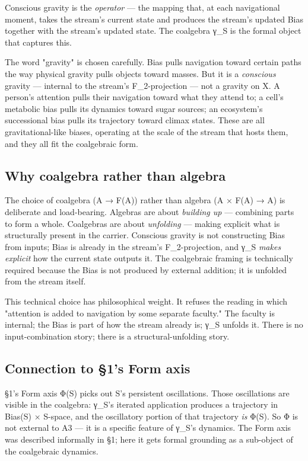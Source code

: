 \documentclass[11pt, openany]{book}
\begin{document}
Conscious gravity is the \textit{operator} --- the mapping that, at each navigational moment, takes the stream's current state and produces the stream's updated Bias together with the stream's updated state. The coalgebra γ\_\allowbreak{}S is the formal object that captures this.

The word "gravity" is chosen carefully. Bias pulls navigation toward certain paths the way physical gravity pulls objects toward masses. But it is a \textit{conscious} gravity --- internal to the stream's F\_\allowbreak{}2-projection --- not a gravity on X. A person's attention pulls their navigation toward what they attend to; a cell's metabolic bias pulls its dynamics toward sugar sources; an ecosystem's successional bias pulls its trajectory toward climax states. These are all gravitational-like biases, operating at the scale of the stream that hosts them, and they all fit the coalgebraic form.

\subsection{Why coalgebra rather than algebra}

The choice of coalgebra (A → F(A)) rather than algebra (A × F(A) → A) is deliberate and load-bearing. Algebras are about \textit{building up} --- combining parts to form a whole. Coalgebras are about \textit{unfolding} --- making explicit what is structurally present in the carrier. Conscious gravity is not constructing Bias from inputs; Bias is already in the stream's F\_\allowbreak{}2-projection, and γ\_\allowbreak{}S \textit{makes explicit} how the current state outputs it. The coalgebraic framing is technically required because the Bias is not produced by external addition; it is unfolded from the stream itself.

This technical choice has philosophical weight. It refuses the reading in which "attention is added to navigation by some separate faculty." The faculty is internal; the Bias is part of how the stream already is; γ\_\allowbreak{}S unfolds it. There is no input-combination story; there is a structural-unfolding story.

\subsection{Connection to §1's Form axis}

§1's Form axis Φ(S) picks out S's persistent oscillations. Those oscillations are visible in the coalgebra: γ\_\allowbreak{}S's iterated application produces a trajectory in Bias(S) × S-space, and the oscillatory portion of that trajectory \textit{is} Φ(S). So Φ is not external to A3 --- it is a specific feature of γ\_\allowbreak{}S's dynamics. The Form axis was described informally in §1; here it gets formal grounding as a sub-object of the coalgebraic dynamics.
\end{document}
